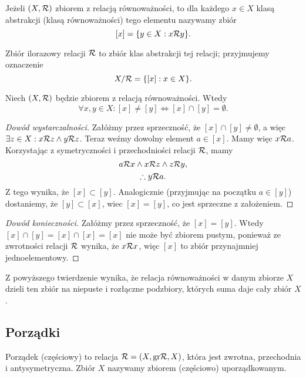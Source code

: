 \begin{definition}
    Jeżeli $(X, \mathcal R)$ zbiorem z relacją równoważności, to dla każdego $x \in X$ klasą abstrakcji (klasą równoważności) tego elementu nazywamy zbiór
    \[ [x] = \{y \in X : x \mathcal R y\}. \]
\end{definition}

\begin{definition}
    Zbiór ilorazowy relacji $\mathcal R$ to zbiór klas abstrakcji tej relacji; przyjmujemy oznaczenie
    \[ X/\mathcal R = \{[x] : x \in X\}. \]
\end{definition}

\begin{theorem}
    Niech $(X, \mathcal R)$ będzie zbiorem z relacją równoważności. Wtedy
    \[ \forall x, y \in X : [x] \neq [y] \iff [x] \cap [y] = \emptyset . \]
\end{theorem}
\begin{proof}[Dowód wystarczalności]\renewcommand{\qedsymbol}{}
    Załóżmy przez sprzeczność, że $[x] \cap [y] \neq \emptyset$, a więc $\exists z \in X : x \mathcal R z \wedge y \mathcal R z$. Teraz weźmy dowolny element $a \in [x]$. Mamy więc $x \mathcal R a$. Korzystając z symetryczności i przechodniości relacji $\mathcal R$, mamy
    \[ a \mathcal R x \wedge x \mathcal R z \wedge z \mathcal R y, \]
    \[ \therefore y \mathcal R a. \]
    Z tego wynika, że $[x] \subset [y]$. Analogicznie (przyjmując na początku $a \in [y]$) dostaniemy, że $[y] \subset [x]$, wiec $[x] = [y]$, co jest sprzeczne z założeniem.
\end{proof}
\begin{proof}[Dowód konieczności]
    Załóżmy przez sprzeczność, że $[x] = [y]$. Wtedy $[x] \cap [y] = [x] \cap [x] = [x]$ nie może być zbiorem pustym, ponieważ ze zwrotności relacji $\mathcal R$ wynika, że $x \mathcal R x$, więc $[x]$ to zbiór przynajmniej jednoelementowy.
\end{proof}

Z powyższego twierdzenie wynika, że relacja równoważności w danym zbiorze $X$ dzieli ten zbiór na niepuste i rozłączne podzbiory, których suma daje cały zbiór $X$.

\subsection{Porządki}
\begin{definition}
    Porządek (częściowy) to relacja $\mathcal R = (X, \operatorname{gr}\!\mathcal R, X)$, która jest zwrotna, przechodnia i antysymetryczna. Zbiór $X$ nazywamy zbiorem (częściowo) uporządkowanym.
\end{definition}

